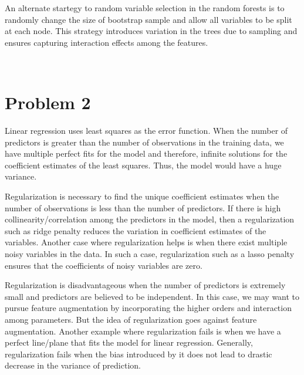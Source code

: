 \documentclass[11pt]{article}
\begin{document}
\vspace{5 mm}
\noindent
An alternate startegy to random variable selection in the random forests is to 
randomly change the size of bootstrap sample and allow all variables to be 
split at each node. This strategy introduces variation in the trees due to 
sampling and ensures capturing interaction effects among the features. 

\begin{center}
\ \\
\end{center}

\section*{Problem 2}

\vspace{5 mm}
\noindent
Linear regression uses least squares as the error function. When the number of 
predictors is greater than the number of observations in the training data, we 
have multiple perfect fits for the model and therefore, infinite solutions for 
the coefficient estimates of the least squares. Thus, the model would have a 
huge variance.

\vspace{5 mm}
\noindent
Regularization is necessary to find the unique coefficient estimates when the 
number of observations is less than the number of predictors. If there is high 
collinearity/correlation among the predictors in the model, then a 
regularization such as ridge penalty reduces the variation in coefficient 
estimates of the variables. Another case where regularization helps is when 
there exist multiple noisy variables in the data. In such a case, 
regularization such as a lasso penalty ensures that the coefficients of noisy 
variables are zero.

\vspace{5 mm}
\noindent
Regularization is disadvantageous when the number of predictors is extremely 
small and predictors are believed to be  independent. In this case, we may want 
to pursue feature augmentation by incorporating the higher orders and 
interaction among parameters. But the idea of regularization goes against 
feature augmentation. Another example where regularization fails is when we 
have a perfect line/plane that fits the model for linear regression. Generally, 
regularization fails when the bias introduced by it does not lead to drastic 
decrease in the variance of prediction. 
\end{document}
